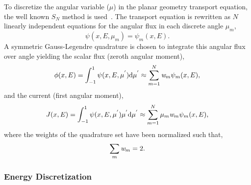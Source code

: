\noindent
	\indent To discretize the angular variable (${\mu}$) in the planar geometry 
	transport equation, the well known ${S_N}$ method is
	used~\cite{Lew:93}.  The transport equation is rewritten as ${N}$ linearly
	independent equations for the angular flux in each discrete angle ${\mu}_m$,
\begin{equation}
	\psi({x},{E},{\mu}_{m})=\psi_{m}({x},{E}).
\end{equation}	
	A symmetric Gauss-Legendre quadrature is chosen to integrate this angular flux over angle
	yielding the scalar flux (zeroth angular moment),
\begin{equation}
	\phi({x},{E})=\int_{-1}^{1}{\psi}({x},{E},{\mu}^{'})\mathrm{d}{\mu}^{'}
		\approx \sum^{N}_{m=1}\emph{w}_{m}\psi_{m}({x},{E}),
	\label{eq:ang_int}
\end{equation}	
	and the current (first angular moment),
\begin{equation}
	J({x},{E})=\int_{-1}^{1}{\psi}({x},{E},{\mu}^{'})\mu^{'}\mathrm{d}{\mu}^{'}
		\approx \sum^{N}_{m=1}\mu_{m}\emph{w}_{m}\psi_{m}({x},{E}),
	\label{eq:ang_int2}
\end{equation}	
	where the weights of the quadrature set have been normalized such that, 
\begin{equation}
	\sum_{m}\emph{w}_{m}=2.
\end{equation}	

\belowSubSecSkip

\subsubsection{Energy Discretization}
\label{sec:Transport-Discret-Eng}


